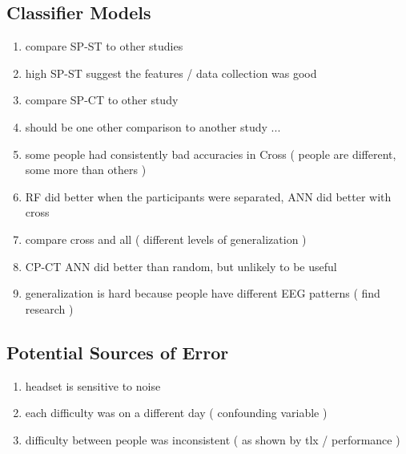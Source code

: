 \documentclass[11pt]{article}
\begin{document}
	
	
		
	
	\subsection{Classifier Models}
	
	\begin{enumerate}
		\item compare SP-ST to other studies
		\item high SP-ST suggest the features / data collection was good
		\item compare SP-CT to other study
		\item should be one other comparison to another study ...
		\item some people had consistently bad accuracies in Cross ( people are different, some more than others )
		\item RF did better when the participants were separated, ANN did better with cross
		\item compare cross and all ( different levels of generalization )
		\item CP-CT ANN did better than random, but unlikely to be useful
		\item generalization is hard because people have different EEG patterns ( find research )
	\end{enumerate}
		
	
	\subsection{Potential Sources of Error}
	\begin{enumerate}
		\item headset is sensitive to noise
		\item  each difficulty was on a different day ( confounding variable )
		\item difficulty between people was inconsistent ( as shown by tlx / performance )
	\end{enumerate}
\end{document}
